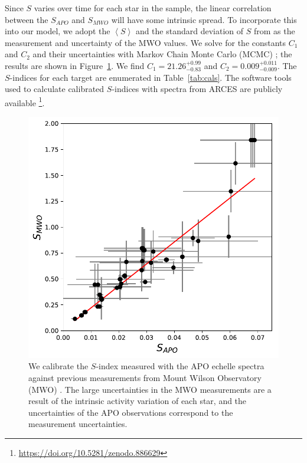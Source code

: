 Since $S$ varies over time for each star in the sample, the linear correlation between the $S_{APO}$ and $S_{MWO}$ will have some intrinsic spread. To incorporate this into our model, we adopt the $\left< S \right>$ and the standard deviation of $S$ from \citet{Duncan1991} as the measurement and uncertainty of the MWO values. We solve for the constants $C_1$ and $C_2$ and their uncertainties with Markov Chain Monte Carlo (MCMC) \citep{Goodman2010, Foreman-Mackey2013}; the results are shown in Figure~\ref{fig:calib}. We find $C_1 = 21.26_{-0.83}^{+0.99}$ and $C_2 = 0.009_{-0.009}^{+0.011}$. The $S$-indices for each target are enumerated in Table~\ref{tab:cals}. The software tools used to calculate calibrated $S$-indices with spectra from ARCES are publicly available \footnote{\url{https://doi.org/10.5281/zenodo.886629}}.

\begin{figure}
\begin{center}
\includegraphics[scale=0.8]{sindex/s-index_calibration.pdf}
\caption{We calibrate the $S$-index measured with the APO echelle spectra against previous measurements from Mount Wilson Observatory (MWO) \citep{Duncan1991}. The large uncertainties in the MWO measurements are a result of the intrinsic activity variation of each star, and the uncertainties of the APO observations correspond to the measurement uncertainties.}
\end{center}
\label{fig:calib}
\end{figure}

